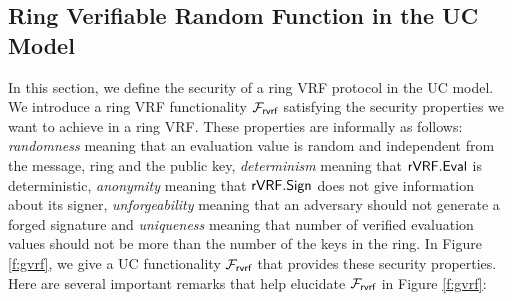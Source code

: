 
\subsection{Ring Verifiable Random Function in the UC Model}
\label{subsec:uc_model}

In this section, we define the security of  a ring VRF protocol in the UC model. We introduce a ring VRF functionality $ \mathcal{F}_{\textsf{rvrf}} $ satisfying the security properties we want to achieve in a ring VRF. These properties are informally as follows: \emph{randomness} meaning that an evaluation value is random and independent from the message, ring and the public key, \emph{determinism} meaning that $ {\mathsf{rVRF}}.{\mathsf{Eval}} $ is deterministic, \emph{anonymity} meaning that $ {\mathsf{rVRF}}.{\mathsf{Sign}} $ does not give information about its signer, \emph{unforgeability} meaning that an adversary should not generate a forged signature and \emph{uniqueness} meaning that number of verified evaluation values should not be more than the number of the keys in the ring.
In Figure \ref{f:gvrf}, we give a UC functionality $\mathcal{F}_{\textsf{rvrf}}$ that provides these security properties.  
Here are several important remarks that help elucidate $\mathcal{F}_{\textsf{rvrf}}$ in Figure \ref{f:gvrf}:



